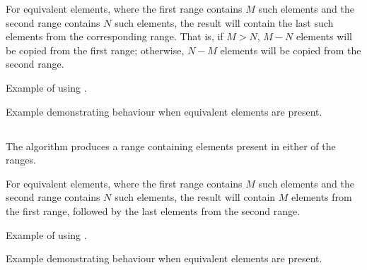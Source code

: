 For equivalent elements, where the first range contains $M$ such elements and the second range contains $N$ such elements, the result will contain the last  such elements from the corresponding range. That is, if $M>N$, $M-N$ elements will be copied from the first range; otherwise, $N-M$ elements will be copied from the second range.

\begin{box-note}
\footnotesize Example of using .
\tcblower
{}
\end{box-note}

\begin{box-note}
\footnotesize Example demonstrating  behaviour when equivalent elements are present.
\tcblower
{}
\end{box-note}

\subsection{\texorpdfstring{}{\texttt{std::set\_union}}}

The  algorithm produces a range containing elements present in either of the ranges.


For equivalent elements, where the first range contains $M$ such elements and the second range contains $N$ such elements, the result will contain $M$ elements from the first range, followed by the last  elements from the second range.

\begin{box-note}
\footnotesize Example of using .
\tcblower
{}
\end{box-note}

\begin{box-note}
\footnotesize Example demonstrating  behaviour when equivalent elements are present.
\tcblower
{}
\end{box-note}


